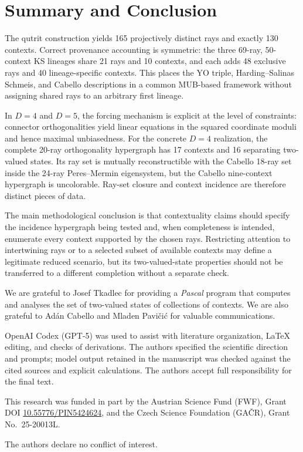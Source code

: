 \documentclass[%
  reprint,
  superscriptaddress,
  showpacs,
  showkeys,
  amsmath,amssymb,
  pra,
  longbibliography,
  floatfix,
  x11names
]{revtex4-2}
\newcommand{\rev}[1]{{\color{revisionblue}#1}}
\newenvironment{revision}{\begingroup\color{revisionblue}}{\endgroup}
\begin{document}
\section{Summary and Conclusion}


\begin{revision}
The qutrit construction yields 165 projectively distinct rays and exactly 130 contexts.  Correct provenance accounting is symmetric: the three 69-ray, 50-context KS lineages share 21 rays and 10 contexts, and each adds 48 exclusive rays and 40 lineage-specific contexts.  This places the YO triple, Harding--Salinas Schmeis, and Cabello descriptions in a common MUB-based framework without assigning shared rays to an arbitrary first lineage.

In $D=4$ and $D=5$, the forcing mechanism is explicit at the level of constraints: connector orthogonalities yield linear equations in the squared coordinate moduli and hence maximal unbiasedness.  For the concrete $D=4$ realization, the complete 20-ray orthogonality hypergraph has 17 contexts and 16 separating two-valued states.  Its ray set is mutually reconstructible with the Cabello 18-ray set inside the 24-ray Peres--Mermin eigensystem, but the Cabello nine-context hypergraph is uncolorable.  Ray-set closure and context incidence are therefore distinct pieces of data.

The main methodological conclusion is that contextuality claims should specify the incidence hypergraph being tested and, when completeness is intended, enumerate every context supported by the chosen rays.  Restricting attention to intertwining rays or to a selected subset of available contexts may define a legitimate reduced scenario, but its two-valued-state properties should not be transferred to a different completion without a separate check.
\end{revision}

\begin{acknowledgments}
We are grateful to Josef Tkadlec for providing a {\em Pascal} program that computes and analyses the set of two-valued states of collections of contexts.
We are also grateful to Ad\'{a}n Cabello and Mladen Pavi{\v{c}}i{\'{c}} for valuable communications.

\rev{OpenAI Codex (GPT-5) was used to assist with literature organization, \LaTeX{}
editing, and checks of derivations.  The authors specified the scientific
direction and prompts; model output retained in the manuscript was checked
against the cited sources and explicit calculations.  The authors accept full
responsibility for the final text.}

This research was funded in part by the Austrian
Science Fund (FWF), Grant DOI \href{https://doi.org/10.55776/PIN5424624}{10.55776/PIN5424624}, and the Czech Science
Foundation (GA\v{C}R), Grant No.~25-20013L.

The authors declare no conflict of interest.
\end{acknowledgments}
\end{document}
